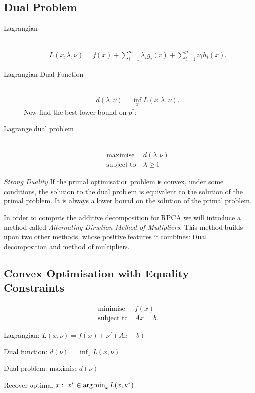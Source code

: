 \subsection{Dual Problem}
\begin{description}
    \item[Lagrangian] \
        \begin{align*}
                L(x,\lambda, \nu) =  f(x) + \sum_{i=1}^m \lambda_i g_i(x) + \sum_{i=1}^p \nu_i h_i(x).
        \end{align*}
    \item[Lagrangian Dual Function] \
        \begin{align*}
            d(\lambda, \nu) = \inf_x L(x,\lambda, \nu).
        \end{align*}
        Now find the best lower bound on $p^*$:
    \item[Lagrange dual problem] \ 
        \begin{align*}
            \text{maximise}\ &d(\lambda, \nu)\\
            \text{subject to}\ &\lambda \geq 0
        \end{align*}
\end{description}

\emph{Strong Duality} If the primal optimisation problem is convex, under some conditions, the solution to the dual problem is equivalent to the solution of the primal problem.
It is always a lower bound on the solution of the primal problem.

In order to compute the additive decomposition for RPCA we will introduce a method called \emph{Alternating Direction Method of Multipliers}. This method builds upon two other methods, whose positive features it combines: Dual decomposition and method of multipliers.
\subsection{Convex Optimisation with Equality Constraints}
\begin{align*}
    \text{minimise}\ &f(x)\\
    \text{subject to}\ &Ax=b.
\end{align*}
\begin{description}
\item Lagrangian: $L(x,\nu) = f(x) + \nu^T (Ax-b)$
\item Dual function: $d(\nu) =\inf_x L(x,\nu)$
\item Dual problem: $\text{maximise}\ d(\nu)$
\item Recover optimal $x:\ x^*\in\operatorname*{arg\,min}_x L(x,\nu^*)$ 
\end{description}

